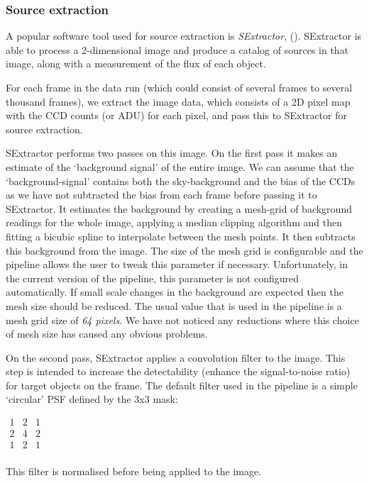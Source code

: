 \subsubsection{Source extraction}
A popular software tool used for source extraction is \emph{SExtractor}, (\cite{bertin}). SExtractor is able to process a 2-dimensional image and produce a catalog of sources in that image, along with a measurement of the flux of each object. 

For each frame in the data run (which could consist of several frames to several thousand frames), we extract the image data, which consists of a 2D pixel map with the CCD counts (or ADU) for each pixel, and pass this to SExtractor for source extraction. 

SExtractor performs two passes on this image. On the first pass it makes an estimate of the `background signal' of the entire image. We can assume that the `background-signal' contains both the sky-background and the bias of the CCDs as we have not subtracted the bias from each frame before passing it to SExtractor. It estimates the background by creating a mesh-grid of background readings for the whole image, applying a median clipping algorithm and then fitting a bicubic spline to interpolate between the mesh points. It then subtracts this background from the image. The size of the mesh grid is configurable and the pipeline allows the user to tweak this parameter if necessary. Unfortunately, in the current version of the pipeline, this parameter is not configured automatically.  If small scale changes in the background are expected then the mesh size should be reduced. The usual value that is used in the pipeline is a mesh grid size of \emph{64 pixels}. We have not noticed any reductions where this choice of mesh size has caused any obvious problems. 

On the second pass, SExtractor applies a convolution filter to the image. This step is intended to increase the detectability (enhance the signal-to-noise ratio) for target objects on the frame. The default filter used in the pipeline is a simple `circular' PSF defined by the 3x3 mask:

$
\begin{array}{ccc}
  1 & 2 & 1 \\
  2 & 4 & 2 \\
  1 & 2 & 1 \\
\end{array}  
$

This filter is normalised before being applied to the image.

